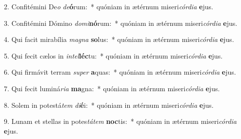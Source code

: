 2. Confitémini De\textit{o} \textit{de}\textbf{ó}rum:~*  quóniam in ætérnum miseri\textit{cór}\textit{di}\textit{a} \textbf{e}jus.\

3. Confitémini Dómino \textit{do}\textit{mi}\textbf{nó}rum:~*  quóniam in ætérnum miseri\textit{cór}\textit{di}\textit{a} \textbf{e}jus.\

4. Qui facit mirabília \textit{ma}\textit{gna} \textbf{so}lus:~*  quóniam in ætérnum miseri\textit{cór}\textit{di}\textit{a} \textbf{e}jus.\

5. Qui fecit cælos in \textit{in}\textit{tel}\textbf{léc}tu:~*  quóniam in ætérnum miseri\textit{cór}\textit{di}\textit{a} \textbf{e}jus.\

6. Qui firmávit terram \textit{su}\textit{per} \textbf{a}quas:~*  quóniam in ætérnum miseri\textit{cór}\textit{di}\textit{a} \textbf{e}jus.\

7. Qui fecit luminá\textit{ri}\textit{a} \textbf{ma}gna:~*  quóniam in ætérnum miseri\textit{cór}\textit{di}\textit{a} \textbf{e}jus.\

8. Solem in potestá\textit{tem} \textit{di}\textbf{é}i:~*  quóniam in ætérnum miseri\textit{cór}\textit{di}\textit{a} \textbf{e}jus.\

9. Lunam et stellas in potes\textit{tá}\textit{tem} \textbf{noc}tis:~*  quóniam in ætérnum miseri\textit{cór}\textit{di}\textit{a} \textbf{e}jus.\

